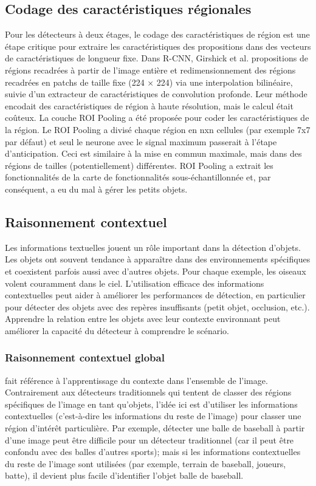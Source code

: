      \subsection{Codage des caractéristiques régionales}
     Pour les détecteurs à deux étages, le codage des caractéristiques de région est une étape critique pour extraire les caractéristiques des propositions dans des vecteurs de caractéristiques de longueur fixe. Dans R-CNN, Girshick et al. \cite{rcnn_paper} propositions de régions recadrées à partir de l'image entière et redimensionnement des régions recadrées en patchs de taille fixe (224 × 224) via une interpolation bilinéaire, suivie d'un extracteur de caractéristiques de convolution profonde. Leur méthode encodait des caractéristiques de région à haute résolution, mais le calcul était coûteux. La couche ROI Pooling a été proposée pour coder les caractéristiques de la région. Le ROI Pooling a divisé chaque région en nxn cellules (par exemple 7x7 par défaut) et seul le neurone avec le signal maximum passerait à l'étape d'anticipation. Ceci est similaire à la mise en commun maximale, mais dans des régions de tailles (potentiellement) différentes. ROI Pooling a extrait les fonctionnalités de la carte de fonctionnalités sous-échantillonnée et, par conséquent, a eu du mal à gérer les petits objets.

     \subsection{Raisonnement contextuel}
     Les informations textuelles jouent un rôle important dans la détection d'objets. Les objets ont souvent tendance à apparaître dans des environnements spécifiques et coexistent parfois aussi avec d'autres objets. Pour chaque exemple, les oiseaux volent couramment dans le ciel. L'utilisation efficace des informations contextuelles peut aider à améliorer les performances de détection, en particulier pour détecter des objets avec des repères insuffisants (petit objet, occlusion, etc.). Apprendre la relation entre les objets avec leur contexte environnant peut améliorer la capacité du détecteur à comprendre le scénario. 
     \subsubsection{Raisonnement contextuel global} fait référence à l'apprentissage du contexte dans l'ensemble de l'image. Contrairement aux détecteurs traditionnels qui tentent de classer des régions spécifiques de l'image en tant qu'objets, l'idée ici est d'utiliser les informations contextuelles (c'est-à-dire les informations du reste de l'image) pour classer une région d'intérêt particulière. Par exemple, détecter une balle de baseball à partir d'une image peut être difficile pour un détecteur traditionnel (car il peut être confondu avec des balles d'autres sports); mais si les informations contextuelles du reste de l'image sont utilisées (par exemple, terrain de baseball, joueurs, batte), il devient plus facile d'identifier l'objet balle de baseball.
